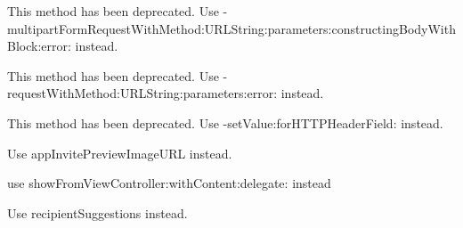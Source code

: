 
\begin{DoxyRefList}
\item[\label{deprecated__deprecated000047}%
\hypertarget{deprecated__deprecated000047}{}%
Member \hyperlink{interface_a_f_h_t_t_p_request_serializer_a7f44ebde3474a05699c9322f400e91ae}{\mbox{[}A\+F\+H\+T\+T\+P\+Request\+Serializer multipart\+Form\+Request\+With\+Method\+:U\+R\+L\+String\+:parameters\+:constructing\+Body\+With\+Block\+:\mbox{]}} ]This method has been deprecated. Use -\/multipart\+Form\+Request\+With\+Method\+:U\+R\+L\+String\+:parameters\+:constructing\+Body\+With\+Block\+:error\+: instead.  
\item[\label{deprecated__deprecated000046}%
\hypertarget{deprecated__deprecated000046}{}%
Member \hyperlink{interface_a_f_h_t_t_p_request_serializer_a66e4fd3cd5ed1b9abf48b3f4109efeaa}{\mbox{[}A\+F\+H\+T\+T\+P\+Request\+Serializer request\+With\+Method\+:U\+R\+L\+String\+:parameters\+:\mbox{]}} ]This method has been deprecated. Use -\/request\+With\+Method\+:U\+R\+L\+String\+:parameters\+:error\+: instead.  
\item[\label{deprecated__deprecated000045}%
\hypertarget{deprecated__deprecated000045}{}%
Member \hyperlink{interface_a_f_h_t_t_p_request_serializer_aa7426bb8422c203a0aeb17f8c04ff8e6}{\mbox{[}A\+F\+H\+T\+T\+P\+Request\+Serializer set\+Authorization\+Header\+Field\+With\+Token\+:\mbox{]}} ]This method has been deprecated. Use -\/set\+Value\+:for\+H\+T\+T\+P\+Header\+Field\+: instead.  
\item[\label{deprecated__deprecated000010}%
\hypertarget{deprecated__deprecated000010}{}%
Member \hyperlink{interface_f_b_s_d_k_app_invite_content_ad1f24aa00510bb8f3ff4236d56a221bf}{\mbox{[}F\+B\+S\+D\+K\+App\+Invite\+Content \+\_\+\+\_\+attribute\+\_\+\+\_\+\mbox{]}} ]Use {\ttfamily app\+Invite\+Preview\+Image\+U\+R\+L} instead.  
\item[\label{deprecated__deprecated000011}%
\hypertarget{deprecated__deprecated000011}{}%
Member \hyperlink{interface_f_b_s_d_k_app_invite_dialog_a49e82cc53fb40be0ac3995a206542c64}{\mbox{[}F\+B\+S\+D\+K\+App\+Invite\+Dialog show\+With\+Content\+:delegate\+:\mbox{]}} ]use show\+From\+View\+Controller\+:with\+Content\+:delegate\+: instead  
\item[\label{deprecated__deprecated000012}%
\hypertarget{deprecated__deprecated000012}{}%
Member \hyperlink{interface_f_b_s_d_k_game_request_content_ab88f3c5b306c53ef92841438098600e0}{\mbox{[}F\+B\+S\+D\+K\+Game\+Request\+Content \+\_\+\+\_\+attribute\+\_\+\+\_\+\mbox{]}} ]Use {\ttfamily recipient\+Suggestions} instead.  

\end{DoxyRefList}
